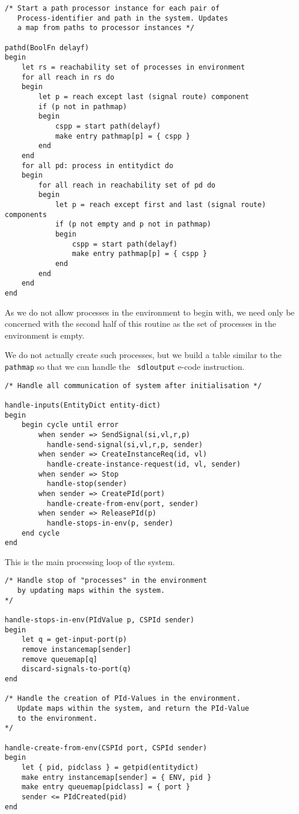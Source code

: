 \begin{verbatim}
/* Start a path processor instance for each pair of
   Process-identifier and path in the system. Updates
   a map from paths to processor instances */

pathd(BoolFn delayf)
begin
    let rs = reachability set of processes in environment
    for all reach in rs do
    begin
        let p = reach except last (signal route) component
        if (p not in pathmap)
        begin
            cspp = start path(delayf)
            make entry pathmap[p] = { cspp }
        end
    end
    for all pd: process in entitydict do
    begin
        for all reach in reachability set of pd do
        begin
            let p = reach except first and last (signal route) components
            if (p not empty and p not in pathmap)
            begin
                cspp = start path(delayf)
                make entry pathmap[p] = { cspp }
            end
        end
    end
end
\end{verbatim}

As we do not allow processes in the environment to begin with, we
need only be concerned with the second half of this routine as the
set of processes in the environment is empty.

We do not actually create such processes, but we build a table
similar to the {\tt pathmap} so that we can handle the {\tt
sdloutput} e-code instruction.

\begin{verbatim}
/* Handle all communication of system after initialisation */

handle-inputs(EntityDict entity-dict)
begin
    begin cycle until error
        when sender => SendSignal(si,vl,r,p)
          handle-send-signal(si,vl,r,p, sender)
        when sender => CreateInstanceReq(id, vl)
          handle-create-instance-request(id, vl, sender)
        when sender => Stop
          handle-stop(sender)
        when sender => CreatePId(port)
          handle-create-from-env(port, sender)
        when sender => ReleasePId(p)
          handle-stops-in-env(p, sender)
    end cycle
end
\end{verbatim}

This is the main processing loop of the system.

\begin{verbatim}
/* Handle stop of "processes" in the environment
   by updating maps within the system.
*/

handle-stops-in-env(PIdValue p, CSPId sender)
begin
    let q = get-input-port(p)
    remove instancemap[sender]
    remove queuemap[q]
    discard-signals-to-port(q)
end

/* Handle the creation of PId-Values in the environment.
   Update maps within the system, and return the PId-Value
   to the environment.
*/

handle-create-from-env(CSPId port, CSPId sender)
begin
    let { pid, pidclass } = getpid(entitydict)
    make entry instancemap[sender] = { ENV, pid }
    make entry queuemap[pidclass] = { port }
    sender <= PIdCreated(pid)
end
\end{verbatim}

